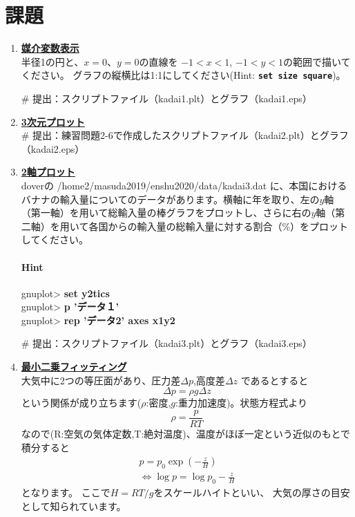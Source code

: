 \documentclass[a4j]{ujarticle} %
\newenvironment{terminal}{%
  \begin{center}
   \begin{minipage}{.8\textwidth}
    \setlength{\FrameSep}{.5\FrameSep}%
    \begin{framed}\ttfamily\small%
     \setlength\baselineskip{.85\baselineskip}%
}{%
    \end{framed}
   \end{minipage}
  \end{center}%
}
\begin{document}
\section{課題}
\begin{enumerate}
\item
\textbf{\underline{媒介変数表示}}\\
半径1の円と、$x=0$、$y=0$の直線を $-1<x<1$, $-1<y<1$の範囲で描いてください。
グラフの縦横比は1:1にしてください(Hint: {\tt\bf set size square})。

\# 提出：スクリプトファイル（kadai1.plt）とグラフ（kadai1.eps）

\item
\textbf{\underline{3次元プロット}}\\
\# 提出：練習問題2-6で作成したスクリプトファイル（kadai2.plt）とグラフ（kadai2.eps）

\item
\textbf{\underline{2軸プロット}}\\
doverの /home2/masuda2019/enshu2020/data/kadai3.dat に、本国におけるバナナの輸入量についてのデータがあります。横軸に年を取り、左の$y$軸（第一軸）を用いて総輸入量の棒グラフをプロットし、さらに右の$y$軸（第二軸）を用いて各国からの輸入量の総輸入量に対する割合（\%）をプロットしてください。

\paragraph{Hint}

\begin{terminal}
 gnuplot> {\bf set y2tics}\\
 gnuplot> {\bf p 'データ１'}\\
 gnuplot> {\bf rep 'データ2' axes x1y2}
\end{terminal}
     
\# 提出：スクリプトファイル（kadai3.plt）とグラフ（kadai3.eps）

\item
\textbf{\underline{最小二乗フィッティング}}\\
大気中に2つの等圧面があり、圧力差$\Delta p$,高度差$\Delta z$
であるとすると
\begin{equation}
 \Delta p = \rho g \Delta z \nonumber
\end{equation}
という関係が成り立ちます($\rho$:密度,$g$:重力加速度)。状態方程式より
\begin{equation}
 \rho = \frac{p}{RT} \nonumber
\end{equation}
なので(R:空気の気体定数,T:絶対温度)、温度がほぼ一定という近似のもとで積分すると
\begin{eqnarray}
 p=p_0 \exp{\left(-\frac{z}{H}\right)} \nonumber \\
 \Leftrightarrow \log{p}=\log{p_0}-\frac{z}{H} \nonumber
\end{eqnarray}
となります。
ここで$H=RT/g$をスケールハイトといい、
大気の厚さの目安として知られています。


\end{enumerate}
\end{document}

